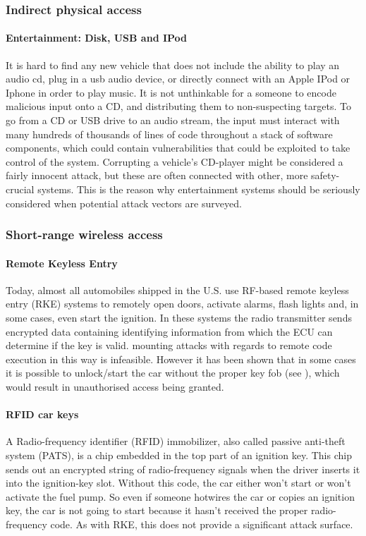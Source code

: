 \documentclass[11pt]{article}
\begin{document}
\subsubsection{Indirect physical access}

\paragraph{Entertainment: Disk, USB and IPod} It is hard to find any new vehicle that does not include the ability to play an audio cd, plug in a usb audio device, or directly connect with an Apple IPod or Iphone in order to play music. It is not unthinkable for a someone to encode malicious input onto a CD, and distributing them to non-suspecting targets. To go from a CD or USB drive to an audio stream, the input must interact with many hundreds of thousands of lines of code throughout a stack of software components, which could contain vulnerabilities that could be exploited to take control of the system\cite{Pike15}. Corrupting a vehicle's CD-player might be considered a fairly innocent attack, but these are often connected with other, more safety-crucial systems. This is the reason why entertainment systems should be seriously considered when potential attack vectors are surveyed.

\subsubsection{Short-range wireless access}

\paragraph{Remote Keyless Entry} Today, almost all automobiles shipped in the U.S. use RF-based remote keyless entry (RKE) systems to remotely open doors, activate alarms, flash lights and, in some cases, even start the ignition\cite{Kosher}. In these systems the radio transmitter sends encrypted data containing identifying information from which the ECU can determine if the key is valid\cite{MillerA}. mounting attacks with regards to remote code execution in this way is infeasible. However it has been shown that in some cases it is possible to unlock/start the car without the proper key fob (see \cite{KeeLoq}), which would result in unauthorised access being granted.

\paragraph{RFID car keys} A Radio-frequency identifier (RFID) immobilizer, also called passive anti-theft system (PATS), is a chip embedded in the top part of an ignition key. This chip sends out an encrypted string of radio-frequency signals when the driver inserts it into the ignition-key slot. Without this code, the car either won't start or won't activate the fuel pump. So even if someone hotwires the car or copies an ignition key, the car is not going to start because it hasn't received the proper radio-frequency code\cite{RFID}. As with RKE, this does not provide a significant attack surface.\cite{MillerA}
\end{document}
